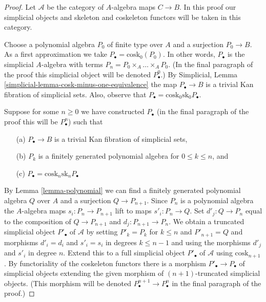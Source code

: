 \begin{proof}
Let $\mathcal{A}$ be the category of $A$-algebra maps $C \to B$.
In this proof our simplicial objects and skeleton and coskeleton
functors will be taken in this category.

\medskip\noindent
Choose a polynomial algebra $P_0$ of finite type over $A$ and a surjection
$P_0 \to B$. As a first approximation we take
$P_\bullet = \text{cosk}_0(P_0)$. In other words, $P_\bullet$ is the simplicial
$A$-algebra with terms $P_n = P_0 \times_A \ldots \times_A P_0$.
(In the final paragraph of the proof this simplicial object will
be denoted $P^0_\bullet$.) By
Simplicial, Lemma \ref{simplicial-lemma-cosk-minus-one-equivalence}
the map $P_\bullet \to B$ is a trivial Kan fibration of simplicial sets.
Also, observe that $P_\bullet = \text{cosk}_0 \text{sk}_0 P_\bullet$.

\medskip\noindent
Suppose for some $n \geq 0$ we have constructed $P_\bullet$
(in the final paragraph of the proof this will be $P^n_\bullet$)
such that
\begin{enumerate}
\item[(a)] $P_\bullet \to B$ is a trivial Kan fibration of simplicial sets,
\item[(b)] $P_k$ is a finitely generated polynomial algebra for
$0 \leq k \leq n$, and
\item[(c)] $P_\bullet = \text{cosk}_n \text{sk}_n P_\bullet$
\end{enumerate}
By Lemma \ref{lemma-polynomial}
we can find a finitely generated polynomial algebra $Q$ over $A$
and a surjection $Q \to P_{n + 1}$. Since $P_n$ is a polynomial algebra
the $A$-algebra maps $s_i : P_n \to P_{n + 1}$ lift to maps
$s'_i : P_n \to Q$. Set $d'_j : Q \to P_n$ equal to the composition of
$Q \to P_{n + 1}$ and $d_j : P_{n + 1} \to P_n$.
We obtain a truncated simplicial object $P'_\bullet$ of $\mathcal{A}$
by setting $P'_k = P_k$ for $k \leq n$ and $P'_{n + 1} = Q$ and morphisms
$d'_i = d_i$ and $s'_i = s_i$ in degrees $k \leq n - 1$ and using the
morphisms $d'_j$ and $s'_i$ in degree $n$. Extend this to a full simplicial
object $P'_\bullet$ of $\mathcal{A}$ using $\text{cosk}_{n + 1}$. By
functoriality of the coskeleton functors there is a morphism
$P'_\bullet \to P_\bullet$ of simplicial objects extending the
given morphism of $(n + 1)$-truncated simplicial objects.
(This morphism will be denoted $P^{n + 1}_\bullet \to P^n_\bullet$
in the final paragraph of the proof.)


\end{proof}
